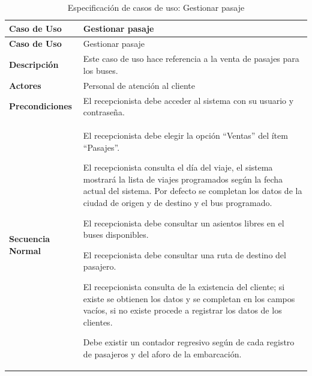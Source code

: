 	\endgroup 
	\vspace{-6pt}  %
	
	\begingroup
	\onehalfspacing
	
	\begin{longtable}{m{4cm} m{10.5cm}}
		\caption[Especificación de casos de uso: Gestionar pasaje]{\newline Especificación de casos de uso: Gestionar pasaje} \label{tab:tabla3_6}\\
		\toprule
		\textbf{Caso de Uso} & Gestionar pasaje \\
		\midrule
		\endfirsthead
		
		\toprule
		\textbf{Caso de Uso} & Gestionar pasaje \\
		\endhead
		
		
		\bottomrule
		\endlastfoot
		
		\textbf{Descripción} & Este caso de uso hace referencia a la venta de pasajes para los buses. \\ \hline
		\textbf{Actores} & Personal de atención al cliente \\ \hline
		\textbf{Precondiciones} & El recepcionista debe acceder al sistema con su usuario y contraseña. \\ \hline
		\textbf{Secuencia Normal} & El recepcionista debe elegir la opción “Ventas” del ítem “Pasajes”.
		
		El recepcionista consulta el día del viaje, el sistema mostrará la lista de viajes programados según la fecha actual del sistema. Por defecto se completan los datos de la ciudad
		de origen y de destino y el bus programado.
		
		El recepcionista debe consultar un asientos libres en el buses disponibles.
		
		El recepcionista debe consultar una ruta de destino del pasajero.
		
		El recepcionista consulta de la existencia del cliente; si existe se obtienen los datos y se completan en los campos vacíos, si no existe procede a registrar los datos de los clientes.
		
		Debe existir un contador regresivo según de cada registro de pasajeros y del aforo de la embarcación.
		

\end{longtable}
